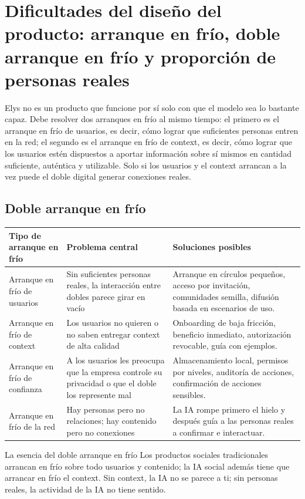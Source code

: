 \section{Dificultades del diseño del producto: arranque en frío, doble arranque en frío y proporción de personas reales}

Elys no es un producto que funcione por sí solo con que el modelo sea lo bastante capaz. Debe resolver dos arranques en frío al mismo tiempo: el primero es el arranque en frío de usuarios, es decir, cómo lograr que suficientes personas entren en la red; el segundo es el arranque en frío de context, es decir, cómo lograr que los usuarios estén dispuestos a aportar información sobre sí mismos en cantidad suficiente, auténtica y utilizable. Solo si los usuarios y el context arrancan a la vez puede el doble digital generar conexiones reales.

\subsection{Doble arranque en frío}

\noindent\begin{longtable}{p{}p{}p{}}
\toprule
Tipo de arranque en frío & Problema central & Soluciones posibles \\
\midrule
Arranque en frío de usuarios & Sin suficientes personas reales, la interacción entre dobles parece girar en vacío & Arranque en círculos pequeños, acceso por invitación, comunidades semilla, difusión basada en escenarios de uso. \\
Arranque en frío de context & Los usuarios no quieren o no saben entregar context de alta calidad & Onboarding de baja fricción, beneficio inmediato, autorización revocable, guía con ejemplos. \\
Arranque en frío de confianza & A los usuarios les preocupa que la empresa controle su privacidad o que el doble los represente mal & Almacenamiento local, permisos por niveles, auditoría de acciones, confirmación de acciones sensibles. \\
Arranque en frío de la red & Hay personas pero no relaciones; hay contenido pero no conexiones & La IA rompe primero el hielo y después guía a las personas reales a confirmar e interactuar. \\
\bottomrule
\end{longtable}

\begin{importantbox}{La esencia del doble arranque en frío}
Los productos sociales tradicionales arrancan en frío sobre todo usuarios y contenido; la IA social además tiene que arrancar en frío el context. Sin context, la IA no se parece a ti; sin personas reales, la actividad de la IA no tiene sentido.
\end{importantbox}

